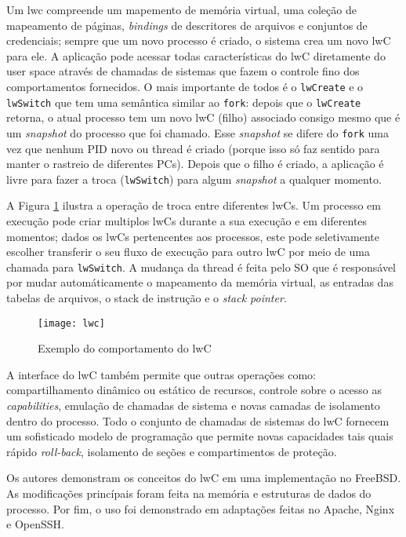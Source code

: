 Um lwc compreende um mapemento de memória virtual, uma coleção de mapeamento de
páginas, \emph{bindings} de descritores de arquivos e conjuntos de credenciais;
sempre que um novo processo é criado, o sistema crea um novo lwC para ele. A
aplicação pode acessar todas características do lwC diretamente do user space
através de chamadas de sistemas que fazem o controle fino dos comportamentos
fornecidos. O mais importante de todos é o \texttt{lwCreate} e o
\texttt{lwSwitch} que tem uma semântica similar ao \texttt{fork}: depois que o
\texttt{lwCreate} retorna, o atual processo tem um novo lwC (filho) associado
consigo mesmo que é um \emph{snapshot} do processo que foi chamado. Esse
\emph{snapshot} se difere do \texttt{fork} uma vez que nenhum PID novo ou
thread é criado (porque isso só faz sentido para manter o rastreio de
diferentes PCs). Depois que o filho é criado, a aplicação é livre para fazer a
troca (\texttt{lwSwitch}) para algum \emph{snapshot} a qualquer momento.

A Figura \ref{fig:lwc} ilustra a operação de troca entre diferentes lwCs. Um
processo em execução pode criar multiplos lwCs durante a sua execução e em
diferentes momentos; dados os lwCs pertencentes aos processos, este pode
seletivamente escolher transferir o seu fluxo de execução para outro lwC por
meio de uma chamada para \texttt{lwSwitch}. A mudança da thread é feita pelo SO
que é responsável por mudar automáticamente o mapeamento da memória virtual, as
entradas das tabelas de arquivos, o stack de instrução e o \emph{stack
pointer}.

\begin{figure}[!h]
  \centering
  \texttt{[image: lwc]} 
  \caption{Exemplo do comportamento do lwC}
  \label{fig:lwc} 
\end{figure}

A interface do lwC também permite que outras operações como: compartilhamento
dinâmico ou estático de recursos, controle sobre o acesso as
\emph{capabilities}, emulação de chamadas de sistema e novas camadas de
isolamento dentro do processo. Todo o conjunto de chamadas de sistemas do lwC
fornecem um sofisticado modelo de programação que permite novas capacidades
tais quais rápido \emph{roll-back}, isolamento de seções e compartimentos de
proteção.

Os autores demonstram os conceitos do lwC em uma implementação no FreeBSD. As
modificações princípais foram feita na memória e estruturas de dados do
processo. Por fim, o uso foi demonstrado em adaptações feitas no Apache, Nginx
e OpenSSH.

